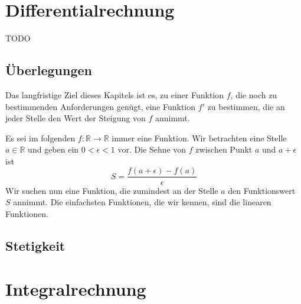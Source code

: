 

\chapter{Differentialrechnung}\label{chap:diff}

TODO


\section{Überlegungen}

Das langfristige Ziel dieses Kapitels ist es, zu einer Funktion $f$, die noch zu bestimmenden Anforderungen genügt, eine Funktion $f'$ zu bestimmen, die an jeder Stelle den Wert der Steigung von $f$ annimmt. 

Es sei im folgenden $f : \mathbb{R} \longrightarrow \mathbb{R}$ immer eine Funktion. Wir betrachten eine Stelle $a\in \mathbb{R}$ und geben ein $0<\epsilon < 1$ vor. Die Sehne von $f$ zwischen Punkt $a$ und $a+\epsilon$ ist
\[
S = \frac{f(a+\epsilon)-f(a)}{\epsilon}
\]
Wir suchen nun eine Funktion, die zumindest an der Stelle $a$ den Funktionswert $S$ annimmt. Die einfachsten Funktionen, die wir kennen, sind die linearen Funktionen.



\section{Stetigkeit}



\chapter{Integralrechnung}


